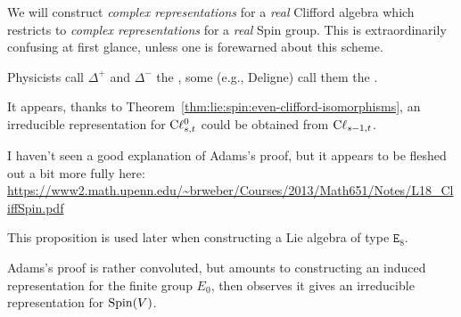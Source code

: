 \begin{danger}
We will construct \emph{complex representations} for a \emph{real}
Clifford algebra which restricts to \emph{complex representations} for a
\emph{real} Spin group. This is extraordinarily confusing at first
glance, unless one is forewarned about this scheme.
\end{danger}

Physicists call $\Delta^{+}$ and $\Delta^{-}$ the ,
some (e.g., Deligne) call them the .

\begin{remark}
It appears, thanks to Theorem~\ref{thm:lie:spin:even-clifford-isomorphisms},
an irreducible representation for $\mathrm{C}\ell_{s,t}^{0}$ could be obtained from
$\mathrm{C}\ell_{s-1,t}$. 
\end{remark}

\begin{remark}
I haven't seen a good explanation of Adams's proof, but it appears to be
fleshed out a bit more fully here: \url{https://www2.math.upenn.edu/~brweber/Courses/2013/Math651/Notes/L18_CliffSpin.pdf}
\end{remark}

\begin{remark}
This proposition is used later when constructing a Lie algebra of type
$\mathtt{E}_{8}$. 
\end{remark}

Adams's proof is rather convoluted, but amounts to constructing an
induced representation for the finite group $E_{0}$, then observes it
gives an irreducible representation for $\operatorname{Spin}(V)$.

